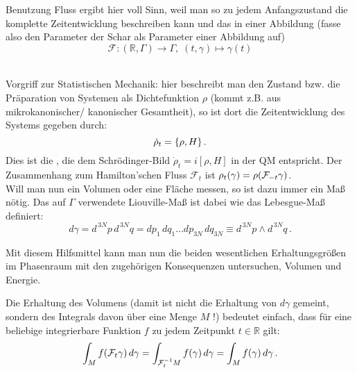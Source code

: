 \documentclass[../class_mech_main.tex]{subfiles}
\begin{document}
Benutzung Fluss ergibt hier voll Sinn, weil man so zu jedem Anfangszustand die komplette Zeitentwicklung beschreiben kann und das in einer Abbildung (fasse also den Parameter der Schar als Parameter einer Abbildung auf)
\begin{equation}
\mathcal{F}: (\mathbb{R}, \Gamma) \rightarrow \Gamma, \; (t, \gamma) \mapsto \gamma(t)
\end{equation}

	\\

Vorgriff zur Statistischen Mechanik: hier beschreibt man den Zustand bzw. die Präparation von Systemen als Dichtefunktion $\rho$ (kommt z.B. aus mikrokanonischer/ kanonischer Gesamtheit), so ist dort die Zeitentwicklung des Systems gegeben durch:
\begin{equation}
\dot{\rho}_t = \qty{\rho, H} \, .
\end{equation}
Dies ist die , die dem Schrödinger-Bild $\dot{\rho}_t = i [\rho, H]$ in der QM entspricht. Der Zusammenhang zum Hamilton'schen Fluss $\mathcal{F}_t$ ist $\rho_t(\gamma) = \rho\qty(\mathcal{F}_{-t} \gamma)$.\\

Will man nun ein Volumen oder eine Fläche messen, so ist dazu immer ein Maß nötig. Das auf $\Gamma$ verwendete Liouville-Maß ist dabei wie das Lebesgue-Maß definiert:
\begin{equation}
d\gamma = d^{\,3N}p \, d^{\,3N}q = dp_1 \, dq_1 \dots dp_{3N} \, dq_{3N} \equiv d^{\,3N}p \wedge d^{\,3N}q \, .
\end{equation}

Mit diesem Hilfsmittel kann man nun die beiden wesentlichen Erhaltungsgrößen im Phasenraum mit den zugehörigen Konsequenzen untersuchen, Volumen und Energie.

Die Erhaltung des Volumens (damit ist nicht die Erhaltung von $d\gamma$ gemeint, sondern des Integrals davon über eine Menge $M$ !) bedeutet einfach, dass für eine beliebige integrierbare Funktion $f$ zu jedem Zeitpunkt $t \in \mathbb{R}$ gilt:
\begin{equation}\label{eq:zeitentw}
\int_M f\qty(\mathcal{F}_t \gamma) \, d\gamma = \int_{\mathcal{F}_t^{-1} M} f\qty(\gamma) \, d\gamma = \int_M f(\gamma) \, d\gamma \, .
\end{equation}
\end{document}
